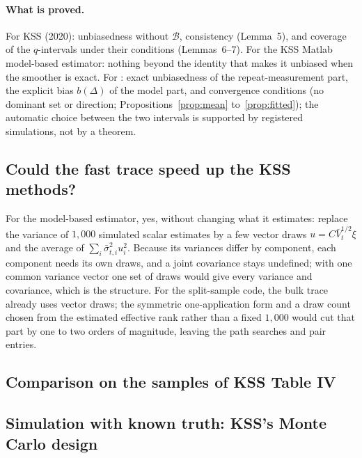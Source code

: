 \paragraph{What is proved.} For KSS (2020): unbiasedness without $\mathcal B$, consistency (Lemma~5), and
coverage of the $q$-intervals under their conditions (Lemmas~6--7). For the KSS Matlab model-based
estimator: nothing beyond the identity that makes it unbiased when the smoother is exact. For \fevc: exact
unbiasedness of the repeat-measurement part, the explicit bias $b(\Delta)$ of the model part, and
convergence conditions (no dominant set or direction; Propositions~\ref{prop:mean} to~\ref{prop:fitted}); the
automatic choice between the two intervals is supported by registered simulations, not by a theorem.

\subsection{Could the fast trace speed up the KSS methods?}\label{kss:sec:speedup}

For the model-based estimator, yes, without changing what it estimates: replace the variance of $1{,}000$
simulated scalar estimates by a few vector draws $u=C\bar V_t^{1/2}\xi$ and the average of
$\sum_i\bar\sigma_{t,i}^2u_i^2$. Because its variances differ by component, each component needs its
own draws, and a joint covariance stays undefined; with one common variance vector one set of draws would
give every variance and covariance, which is the \fevc{} structure. For the split-sample code, the bulk
trace already uses vector draws; the symmetric one-application form and a draw count chosen from the
estimated effective rank rather than a fixed $1{,}000$ would cut that part by one to two orders of
magnitude, leaving the path searches and pair entries.

\subsection{Comparison on the samples of KSS Table IV}\label{kss:sec:empirical}


\subsection{Simulation with known truth: KSS's Monte Carlo design}\label{kss:sec:synth}

